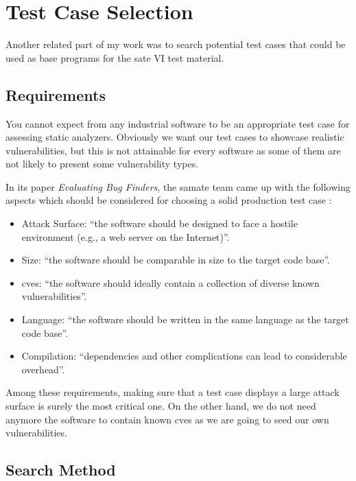 \section{Test Case Selection}

Another related part of my work was to search potential test cases that could be used as base programs for the \gls{sate} VI test material.

\subsection{Requirements}

You cannot expect from any industrial software to be an appropriate test case for assessing static analyzers. Obviously we want our test cases to showcase realistic vulnerabilities, but this is not attainable for every software as some of them are not likely to present some vulnerability types.

In its paper \emph{Evaluating Bug Finders}, the \gls{samate} team came up with the following aspects which should be considered for choosing a solid production test case \cite{delaitre2015evaluating}:

\begin{itemize}
    \item Attack Surface: ``the software should be designed to face a hostile environment (e.g., a web server on the Internet)''.
    \item Size: ``the software should be comparable in size to the target code base''.
    \item \glspl{cve}: ``the software should ideally contain a collection of diverse known vulnerabilities''.
    \item Language: ``the software should be written in the same language as the target code base''.
    \item Compilation: ``dependencies and other complications can lead to considerable overhead''.
\end{itemize}

Among these requirements, making sure that a test case displays a large attack surface is surely the most critical one. On the other hand, we do not need anymore the software to contain known \glspl{cve} as we are going to seed our own vulnerabilities.

\subsection{Search Method}


